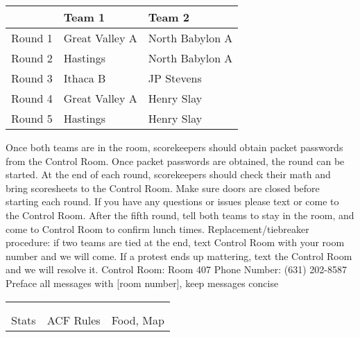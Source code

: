 \documentclass{article}%
\begin{document}
%
\begin{tabularx}{\textwidth}{|c|Y|Y|}%
\hline%
&Team 1&Team 2\\%
\hline%
Round 1&Great Valley A&North Babylon A\\%
Round 2&Hastings&North Babylon A\\%
Round 3&Ithaca B&JP Stevens\\%
Round 4&Great Valley A&Henry Slay\\%
Round 5&Hastings&Henry Slay\\%
\hline%
\end{tabularx}%
\vspace*{16pt}%
\linebreak%
Once both teams are in the room, scorekeepers should obtain packet passwords from the Control Room. Once packet passwords are obtained, the round can be started. At the end of each round, scorekeepers should check their math and bring scoresheets to the Control Room.\newline%
\newline%
Make sure doors are closed before starting each round. If you have any questions or issues please text or come to the Control Room.\newline%
\newline%
After the fifth round, tell both teams to stay in the room, and come to Control Room to confirm lunch times.\newline%
\newline%
Replacement/tiebreaker procedure: if two teams are tied at the end, text Control Room with your room number and we will come. If a protest ends up mattering, text the Control Room and we will resolve it.\newline%
\newline%
Control Room: Room 407\newline%
Phone Number: (631) 202{-}8587\newline%
Preface all messages with {[}room number{]}, keep messages concise%
\vspace*{30pt}%
\newline%
%
\begin{tabularx}{\textwidth}{YYY}%
  &  &  \\%
\\%
Stats&ACF Rules&Food, Map\\%
\end{tabularx}%
\end{document}
